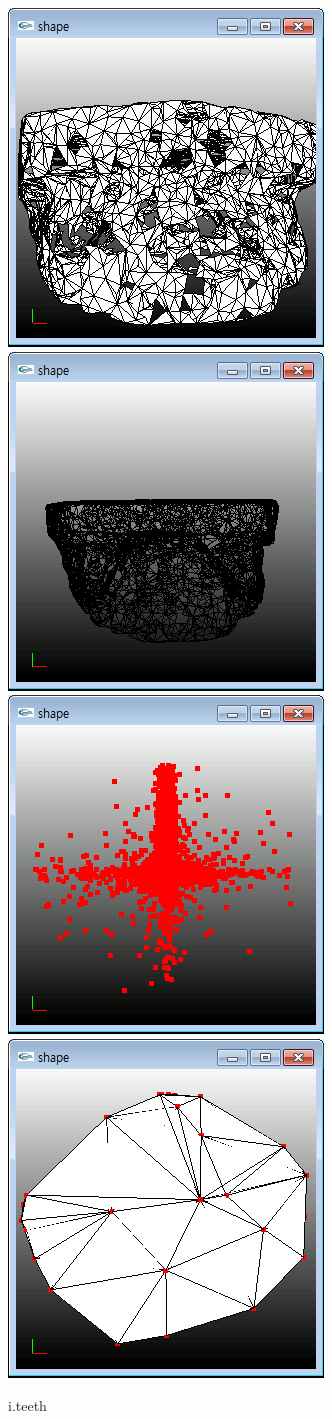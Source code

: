 \documentclass[11pt]{article}
\begin{document}
\begin{figure}[ht]
\centering
\includegraphics[width=.23\textwidth]{FIGS/teeth1}
\hspace{0.2cm}
\includegraphics[width=.23\textwidth]{FIGS/teeth2}
\hspace{0.2cm}
\includegraphics[width=.23\textwidth]{FIGS/teeth3}
\hspace{0.2cm}
\includegraphics[width=.23\textwidth]{FIGS/teeth4}
\caption{i.teeth}
\end{figure}
\end{document}
